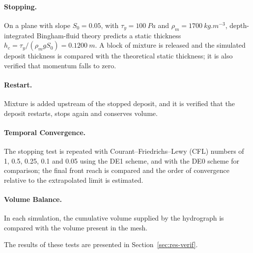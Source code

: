 \paragraph{Stopping.} On a plane with slope $S_0=0.05$, with $\tau_y=\SI{100}{Pa}$ and $\rho_m=\SI{1700}{kg.m^{-3}}$, depth-integrated Bingham-fluid theory predicts a static thickness $h_c=\tau_y/(\rho_m gS_0)=\SI{0.1200}{m}$. A block of mixture is released and the simulated deposit thickness is compared with the theoretical static thickness; it is also verified that momentum falls to zero.

\paragraph{Restart.} Mixture is added upstream of the stopped deposit, and it is verified that the deposit restarts, stops again and conserves volume.

\paragraph{Temporal Convergence.} The stopping test is repeated with Courant--Friedrichs--Lewy (CFL) numbers of 1, 0.5, 0.25, 0.1 and 0.05 using the DE1 scheme, and with the DE0 scheme for comparison; the final front reach is compared and the order of convergence relative to the extrapolated limit is estimated.

\paragraph{Volume Balance.} In each simulation, the cumulative volume supplied by the hydrograph is compared with the volume present in the mesh.

The results of these tests are presented in Section~\ref{sec:res-verif}.

